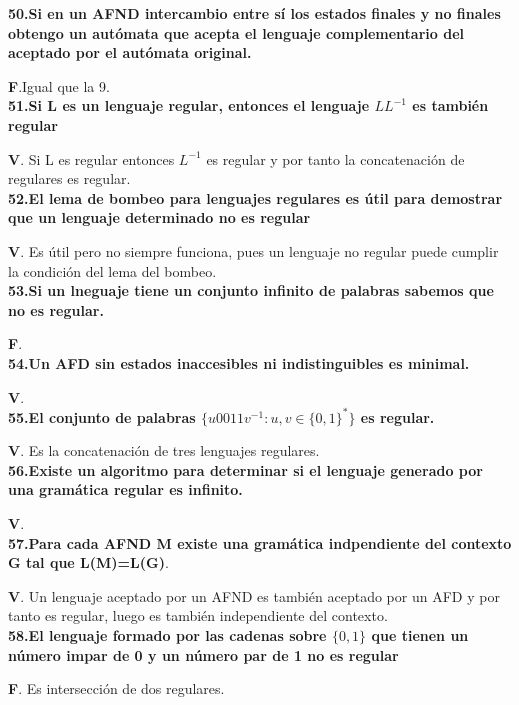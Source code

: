 \documentclass[a4paper,11pt]{article}
\begin{document}
\textbf{50.Si en un AFND intercambio entre sí los estados finales y no finales obtengo un autómata que acepta el lenguaje complementario del aceptado por el autómata original.}

\textbf{F}.Igual que la 9. \\

\textbf{51.Si L es un lenguaje regular, entonces el lenguaje $LL^{-1}$ es también regular}

\textbf{V}. Si L es regular entonces $L^{-1}$ es regular y por tanto la concatenación de regulares es regular. \\

\textbf{52.El lema de bombeo para lenguajes regulares es útil para demostrar que un lenguaje determinado no es regular}

\textbf{V}. Es útil pero no siempre funciona, pues un lenguaje no regular puede cumplir la condición del lema del bombeo. \\

\textbf{53.Si un lneguaje tiene un conjunto infinito de palabras sabemos que no es regular.}

\textbf{F}. \\

\textbf{54.Un AFD sin estados inaccesibles ni indistinguibles es minimal.}

\textbf{V}. \\

\textbf{55.El conjunto de palabras $\{u0011v^{-1}:u,v\in \{0,1\}^*\}$ es regular.}

\textbf{V}. Es la concatenación de tres lenguajes regulares. \\

\textbf{56.Existe un algoritmo para determinar si el lenguaje generado por una gramática regular es infinito.}

\textbf{V}. \\

\textbf{57.Para cada AFND M existe una gramática indpendiente del contexto G tal que L(M)=L(G)}.

\textbf{V}. Un lenguaje aceptado por un AFND es también aceptado por un AFD y por tanto es regular, luego es también independiente del contexto. \\

\textbf{58.El lenguaje formado por las cadenas sobre $\{0,1\}$ que tienen un número impar de 0 y un número par de 1 no es regular}

\textbf{F}. Es intersección de dos regulares. \\
\end{document}
